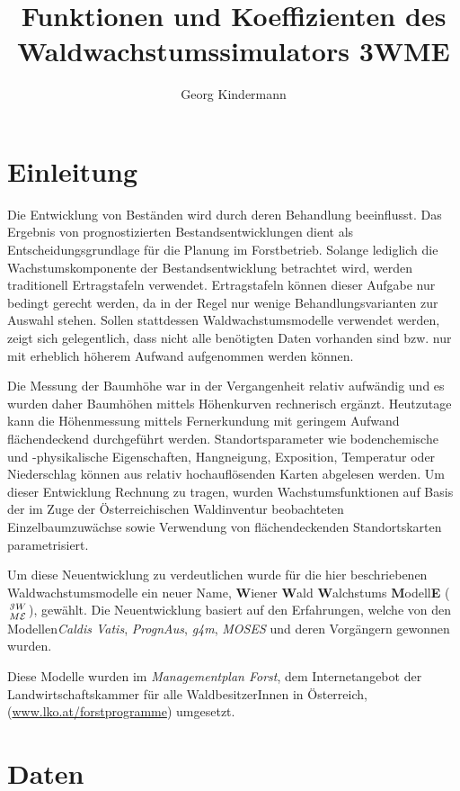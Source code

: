 \documentclass[twocolumn]{scrartcl}
\title{Funktionen und Koeffizienten des Waldwachstumssimulators 3WME}
\author{Georg Kindermann}
\begin{document}
\maketitle
\tableofcontents

\section{Einleitung}

Die Entwicklung von Beständen wird durch deren Behandlung
beeinflusst. Das Ergebnis von prognostizierten Bestandsentwicklungen
dient als Entscheidungsgrundlage für die Planung im
Forstbetrieb. Solange lediglich die Wachstumskomponente der
Bestandsentwicklung betrachtet wird, werden traditionell Ertragstafeln
verwendet. Ertragstafeln können dieser Aufgabe nur bedingt gerecht
werden, da in der Regel nur wenige Behandlungsvarianten zur Auswahl
stehen. Sollen stattdessen Waldwachstumsmodelle verwendet werden,
zeigt sich gelegentlich, dass nicht alle benötigten Daten vorhanden
sind bzw. nur mit erheblich höherem Aufwand aufgenommen werden können.

Die Messung der Baumhöhe war in der Vergangenheit relativ aufwändig
und es wurden daher Baumhöhen mittels Höhenkurven rechnerisch
ergänzt. Heutzutage kann die Höhenmessung mittels Fernerkundung mit
geringem Aufwand flächendeckend durchgeführt werden.
Standortsparameter wie bodenchemische und -physikalische
Eigenschaften, Hangneigung, Exposition, Temperatur oder Niederschlag
können aus relativ hochauflösenden Karten abgelesen werden. Um dieser
Entwicklung Rechnung zu tragen, wurden Wachstumsfunktionen auf Basis
der im Zuge der Österreichischen Waldinventur beobachteten
Einzelbaumzuwächse sowie Verwendung von flächendeckenden
Standortskarten parametrisiert.

Um diese Neuentwicklung zu verdeutlichen wurde für die hier
beschriebenen Waldwachstumsmodelle ein neuer Name, \textbf{W}iener
\textbf{W}ald \textbf{W}alchstums \textbf{M}odell\textbf{E}
($\mathit{3}W \atop M\mathcal{E}$), gewählt. Die Neuentwicklung
basiert auf den Erfahrungen, welche von den Modellen\emph{Caldis
Vatis}, \emph{PrognAus}, \emph{g4m}, \emph{MOSES} und deren
Vorgängern gewonnen wurden.

Diese Modelle wurden im \emph{Managementplan Forst}, dem
Internetangebot der Landwirtschaftskammer für alle WaldbesitzerInnen
in Österreich, (\url{www.lko.at/forstprogramme}) umgesetzt.

\section{Daten}
\end{document}
